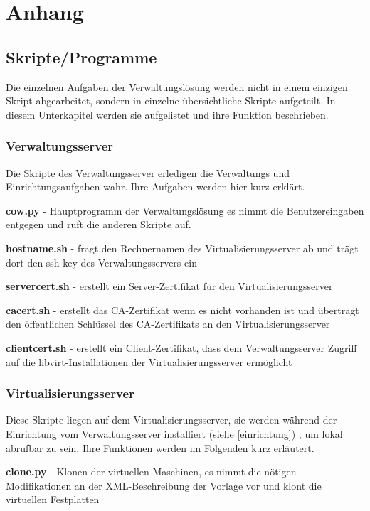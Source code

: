 \chapter{Anhang} 
\section{Skripte/Programme}\label{skripte}
Die einzelnen Aufgaben der Verwaltungslösung werden nicht in einem einzigen Skript abgearbeitet, sondern in einzelne übersichtliche Skripte aufgeteilt. In diesem Unterkapitel werden sie aufgelistet und ihre Funktion beschrieben.

\subsection{Verwaltungsserver}
Die Skripte des Verwaltungsserver erledigen die Verwaltungs und Einrichtungsaufgaben wahr. Ihre Aufgaben werden hier kurz erklärt.

\textbf{cow.py}
- Hauptprogramm der Verwaltungslösung es nimmt die Benutzereingaben entgegen und ruft die anderen Skripte auf.

\textbf{hostname.sh} 
- fragt den Rechnernamen des Virtualisierungsserver ab und trägt dort den ssh-key des Verwaltungsservers ein 

\textbf{servercert.sh}
- erstellt ein Server-Zertifikat für den Virtualisierungsserver

\textbf{cacert.sh}
- erstellt das CA-Zertifikat wenn es nicht vorhanden ist und überträgt den öffentlichen Schlüssel des CA-Zertifikats an den Virtualisierungsserver 

\textbf{clientcert.sh}
- erstellt ein Client-Zertifikat, dass dem Verwaltungsserver Zugriff auf die libvirt-Installationen der Virtualisierungsserver ermöglicht

\subsection{Virtualisierungsserver}
Diese Skripte liegen auf dem Virtualisierungsserver, sie werden während der Einrichtung vom Verwaltungsserver installiert (siehe \ref{einrichtung}) , um lokal abrufbar zu sein. Ihre Funktionen werden im Folgenden kurz erläutert.

\textbf{clone.py}
- Klonen der virtuellen Maschinen, es nimmt die nötigen Modifikationen an der XML-Beschreibung der Vorlage vor und klont die virtuellen Festplatten

